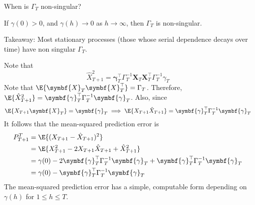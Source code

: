 When is $ \Gamma_T $ non-singular?
\begin{Theorem}{}{}
    If $ \gamma(0)>0 $, and $ \gamma(h)\to 0 $ as $ h\to\infty $, then
    $ \Gamma_T $ is non-singular.
\end{Theorem}
Takeaway: Most stationary processes (those whose serial dependence decays
over time) have non singular $ \Gamma_T $.

Note that
\[ \hat{X}_{T+1}^2=\symbf{\gamma}_T^\top \Gamma_T^{-1}\symbf{X}_T \symbf{X}_T^\top
    \Gamma_T^{-1}\gamma_T \]
Note that $ \E{\symbf{X}_T \symbf{X}_T^\top}=\Gamma_T $.
Therefore, $ \E{\hat{X}_{T+1}^2}=\symbf{\gamma}_T^\top \Gamma_T^{-1} \symbf{\gamma}_T $.
Also, since
\[ \E{X_{T+1}\symbf{X}_T}=\symbf{\gamma}_T\implies
    \E{X_{T+1}\hat{X}_{T+1}}=\symbf{\gamma}_T^\top \Gamma_T^{-1}\symbf{\gamma}_T \]
It follows that the mean-squared prediction error is
\begin{align*}
    P_{T+1}^T
     & =\E{(X_{T+1}-\hat{X}_{T+1})^2}                                                                                       \\
     & =\E{X_{T+1}^2-2 X_{T+1}\hat{X}_{T+1}+\hat{X}_{T+1}^2}                                                                \\
     & =\gamma(0)-2 \symbf{\gamma}_T^\top \Gamma_T^{-1}\symbf{\gamma}_T+\symbf{\gamma}_T^\top \Gamma_T^{-1}\symbf{\gamma}_T \\
     & =\gamma(0)-\symbf{\gamma}_T^\top\Gamma_T^{-1}\symbf{\gamma}_T
\end{align*}
The mean-squared prediction error has a simple, computable
form depending on $ \gamma(h) $ for $ 1\le h\le T $.

